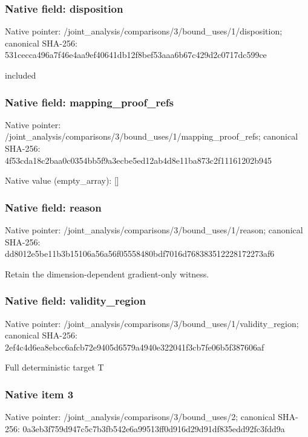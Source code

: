 \documentclass[10pt,a4paper]{article}
\begin{document}
\subsubsection{Native field: disposition}
Native pointer: /joint\_\allowbreak{}analysis/comparisons/3/bound\_\allowbreak{}uses/1/disposition; canonical SHA-256: 531cecca496a7f46e4aa9ef40641db12f8bef53aaa6b67c429d2c0717dc599ce

\begingroup\raggedright\sloppy included\par\endgroup

\subsubsection{Native field: mapping\_\allowbreak{}proof\_\allowbreak{}refs}
Native pointer: /joint\_\allowbreak{}analysis/comparisons/3/bound\_\allowbreak{}uses/1/mapping\_\allowbreak{}proof\_\allowbreak{}refs; canonical SHA-256: 4f53cda18c2baa0c0354bb5f9a3ecbe5ed12ab4d8e11ba873c2f11161202b945

Native value (empty\_\allowbreak{}array): []

\subsubsection{Native field: reason}
Native pointer: /joint\_\allowbreak{}analysis/comparisons/3/bound\_\allowbreak{}uses/1/reason; canonical SHA-256: dd8012e5be11b3b15106a56a56f05558480bdf7016d768383512228172273af6

\begingroup\raggedright\sloppy Retain the dimension-dependent gradient-only witness.\par\endgroup

\subsubsection{Native field: validity\_\allowbreak{}region}
Native pointer: /joint\_\allowbreak{}analysis/comparisons/3/bound\_\allowbreak{}uses/1/validity\_\allowbreak{}region; canonical SHA-256: 2ef4c4d6ea8ebcc6afcb72e9405d6579a4940e322041f3cb7fe06b5f387606af

\begingroup\raggedright\sloppy Full deterministic target T\par\endgroup

\subsubsection{Native item 3}
Native pointer: /joint\_\allowbreak{}analysis/comparisons/3/bound\_\allowbreak{}uses/2; canonical SHA-256: 0a3eb3f759d947c5c7b3fb542e6a99513ff0d916d29d91df835edd92fc3fdd9a
\end{document}
